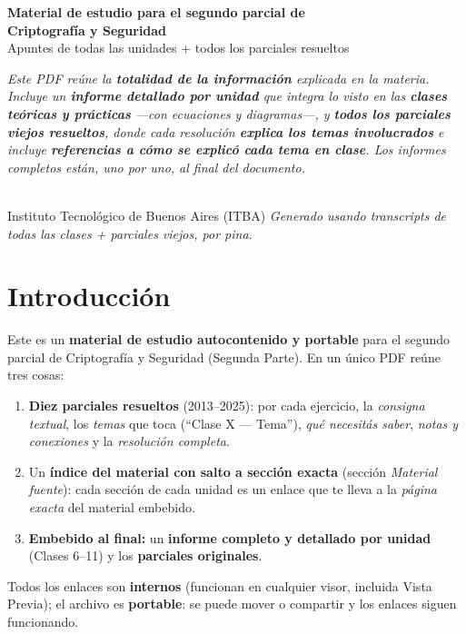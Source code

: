 \documentclass[11pt,a4paper]{article}
\begin{document}

\begin{titlepage}
\centering
\vspace*{2cm}
{\LARGE\bfseries\color{itbaCyanDark} Material de estudio para el segundo parcial de\\[3pt]
Criptografía y Seguridad}\\[0.5cm]
{\large Apuntes de todas las unidades \;+\; todos los parciales resueltos}\\[0.9cm]

{\normalsize
\begin{minipage}{0.88\textwidth}\itshape
Este PDF reúne la \textbf{totalidad de la información} explicada en la materia. Incluye un
\textbf{informe detallado por unidad} que integra lo visto en las \textbf{clases teóricas y
prácticas} —con ecuaciones y diagramas—, y \textbf{todos los parciales viejos resueltos}, donde
cada resolución \textbf{explica los temas involucrados} e incluye \textbf{referencias a cómo se
explicó cada tema en clase}. Los informes completos están, uno por uno, al final del documento.
\end{minipage}}\\[1.0cm]

{\normalsize Instituto Tecnológico de Buenos Aires (ITBA)}
\vfill
{\footnotesize\itshape Generado usando transcripts de todas las clases + parciales viejos, por pina.}
\end{titlepage}

\tableofcontents
\newpage

\section*{Introducción}
Este es un \textbf{material de estudio autocontenido y portable} para el segundo parcial de
Criptografía y Seguridad (Segunda Parte). En un único PDF reúne tres cosas:
\begin{enumerate}[leftmargin=1.5em,itemsep=2pt]
  \item \textbf{Diez parciales resueltos} (2013–2025): por cada ejercicio, la \emph{consigna
        textual}, los \emph{temas} que toca (``Clase X — Tema''), \emph{qué necesitás saber},
        \emph{notas y conexiones} y la \emph{resolución completa}.
  \item Un \textbf{índice del material con salto a sección exacta} (sección \emph{Material fuente}):
        cada sección de cada unidad es un enlace que te lleva a la \emph{página exacta} del
        material embebido.
  \item \textbf{Embebido al final:} un \textbf{informe completo y detallado por unidad} (Clases 6–11)
        y los \textbf{parciales originales}.
\end{enumerate}
Todos los enlaces son \textbf{internos} (funcionan en cualquier visor, incluida Vista Previa); el
archivo es \textbf{portable}: se puede mover o compartir y los enlaces siguen funcionando.
\end{document}
